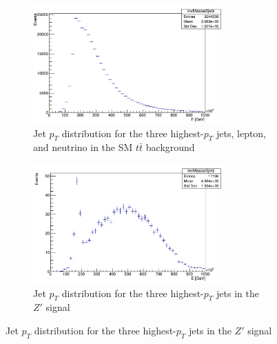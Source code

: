 \begin{figure}[H]
    \centering
    \begin{subfigure}[b]{0.48\textwidth}
        \centering
        \includegraphics[width=0.8\textwidth]{Figure/high_3jet_tt.png}
        \caption{Jet \(p_T\) distribution for the three highest-\(p_T\) jets, lepton, and neutrino in the SM \(t\bar{t}\) background}
        \label{fig:plot_high_a}
    \end{subfigure}
    \hfill
    \begin{subfigure}[b]{0.48\textwidth}
        \centering
        \includegraphics[width=0.8\textwidth]{Figure/high_3jet_zz.png}
        \caption{Jet \(p_T\) distribution for the three highest-\(p_T\) jets in the \(Z'\) signal}
        \label{fig:plot_high_b}
    \end{subfigure}

    \vspace{0.5cm} %


\end{figure}
